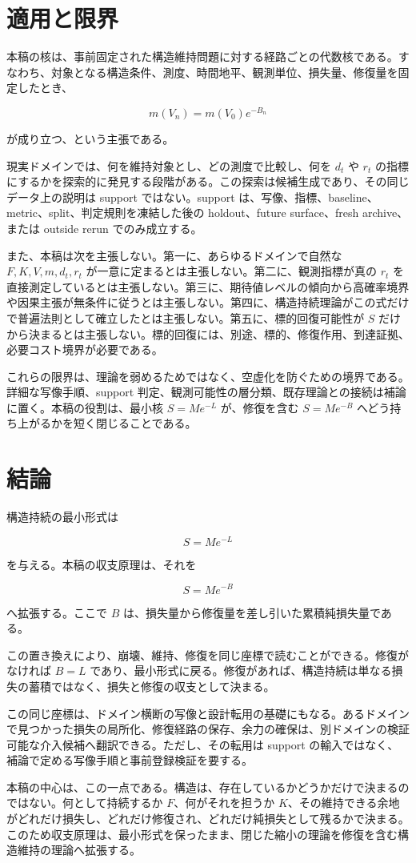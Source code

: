 \documentclass[12pt,a4paper]{article}
\begin{document}
\section{適用と限界}\label{ux9069ux7528ux3068ux9650ux754c}

本稿の核は、事前固定された構造維持問題に対する経路ごとの代数核である。すなわち、対象となる構造条件、測度、時間地平、観測単位、損失量、修復量を固定したとき、

\[
m(V_{n}) = m(V_0) e^{-B_{n}}
\]

が成り立つ、という主張である。

現実ドメインでは、何を維持対象とし、どの測度で比較し、何を \(d_{t}\) や \(r_{t}\) の指標にするかを探索的に発見する段階がある。この探索は候補生成であり、その同じデータ上の説明は support ではない。support は、写像、指標、baseline、metric、split、判定規則を凍結した後の holdout、future surface、fresh archive、または outside rerun でのみ成立する。

また、本稿は次を主張しない。第一に、あらゆるドメインで自然な \(F,K,V,m,d_{t},r_{t}\) が一意に定まるとは主張しない。第二に、観測指標が真の \(r_{t}\) を直接測定しているとは主張しない。第三に、期待値レベルの傾向から高確率境界や因果主張が無条件に従うとは主張しない。第四に、構造持続理論がこの式だけで普遍法則として確立したとは主張しない。第五に、標的回復可能性が \(S\) だけから決まるとは主張しない。標的回復には、別途、標的、修復作用、到達証拠、必要コスト境界が必要である。

これらの限界は、理論を弱めるためではなく、空虚化を防ぐための境界である。詳細な写像手順、support 判定、観測可能性の層分類、既存理論との接続は補論に置く。本稿の役割は、最小核 \(S=Me^{-L}\) が、修復を含む \(S=Me^{-B}\) へどう持ち上がるかを短く閉じることである。

\section{結論}\label{ux7d50ux8ad6}

構造持続の最小形式は

\[
S = M e^{-L}
\]

を与える。本稿の収支原理は、それを

\[
S = M e^{-B}
\]

へ拡張する。ここで \(B\) は、損失量から修復量を差し引いた累積純損失量である。

この置き換えにより、崩壊、維持、修復を同じ座標で読むことができる。修復がなければ \(B=L\) であり、最小形式に戻る。修復があれば、構造持続は単なる損失の蓄積ではなく、損失と修復の収支として決まる。

この同じ座標は、ドメイン横断の写像と設計転用の基礎にもなる。あるドメインで見つかった損失の局所化、修復経路の保存、余力の確保は、別ドメインの検証可能な介入候補へ翻訳できる。ただし、その転用は support の輸入ではなく、補論で定める写像手順と事前登録検証を要する。

本稿の中心は、この一点である。構造は、存在しているかどうかだけで決まるのではない。何として持続するか \(F\)、何がそれを担うか \(K\)、その維持できる余地がどれだけ損失し、どれだけ修復され、どれだけ純損失として残るかで決まる。このため収支原理は、最小形式を保ったまま、閉じた縮小の理論を修復を含む構造維持の理論へ拡張する。
\end{document}
